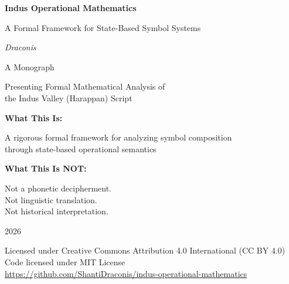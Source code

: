 \begin{titlepage}
    \centering
    \vspace*{2cm}
    
    {\Huge\bfseries Indus Operational Mathematics\par}
    \vspace{0.5cm}
    {\Large A Formal Framework for State-Based Symbol Systems\par}
    
    \vspace{2cm}
    
    {\Large\itshape Draconis\par}
    
    \vfill
    
    {\large A Monograph\par}
    {\large Presenting Formal Mathematical Analysis of\\
    the Indus Valley (Harappan) Script\par}
    
    \vspace{1cm}
    
    {\large\bfseries What This Is:\par}
    {\normalsize
    A rigorous formal framework for analyzing symbol composition\\
    through state-based operational semantics\par}
    
    \vspace{0.5cm}
    
    {\large\bfseries What This Is NOT:\par}
    {\normalsize
    Not a phonetic decipherment.\\
    Not linguistic translation.\\
    Not historical interpretation.\par}
    
    \vfill
    
    {\large 2026\par}
    
    \vspace{0.5cm}
    
    {\footnotesize
    Licensed under Creative Commons Attribution 4.0 International (CC BY 4.0)\\
    Code licensed under MIT License\\
    \url{https://github.com/ShantiDraconis/indus-operational-mathematics}
    \par}
\end{titlepage}

\newpage
\thispagestyle{empty}
\mbox{}
